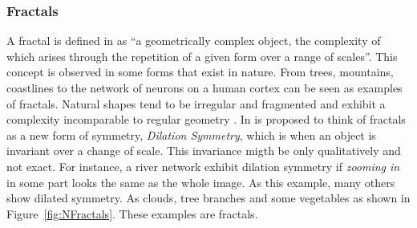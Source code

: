 
\subsubsection{Fractals} %
\label{ssub:fractals}


A fractal is defined in \cite{Ebert2002} as ``a geometrically complex object, the complexity of which arises through the repetition of a given form over a range of scales''.
This concept is observed in some forms that exist in nature. From trees, mountains, coastlines to the network of neurons on a human cortex can be seen as examples of fractals. Natural shapes tend to be irregular and fragmented and exhibit a complexity incomparable to regular geometry \cite{mandelbrot1984fractal}.
In \cite{Ebert2002} is proposed to think of fractals as a new form of symmetry, \emph{Dilation Symmetry}, which is when an object is invariant over a change of scale. This invariance migth be only qualitatively and not exact. For instance, a river network exhibit dilation symmetry if \textit{zooming in} in some part looks the same as the whole image. As this example, many others show dilated symmetry. As clouds, tree branches and some vegetables as shown in Figure~\ref{fig:NFractals}. These examples are fractals.

